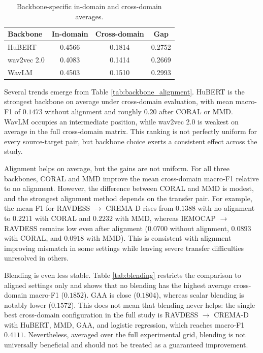﻿\documentclass[10pt,twocolumn,letterpaper]{article}
\begin{document}
\begin{table}[t]
\centering
\caption{Backbone-specific in-domain and cross-domain averages.}
\label{tab:domain_gap}
\scriptsize
\setlength{\tabcolsep}{4pt}
\begin{tabular}{lccc}
\hline
Backbone & In-domain & Cross-domain & Gap \\
\hline
HuBERT & 0.4566 & 0.1814 & 0.2752 \\
wav2vec 2.0 & 0.4083 & 0.1414 & 0.2669 \\
WavLM & 0.4503 & 0.1510 & 0.2993 \\
\hline
\end{tabular}
\end{table}

Several trends emerge from Table \ref{tab:backbone_alignment}. HuBERT is the strongest backbone on average under cross-domain evaluation, with mean macro-F1 of $0.1473$ without alignment and roughly $0.20$ after CORAL or MMD. WavLM occupies an intermediate position, while wav2vec 2.0 is weakest on average in the full cross-domain matrix. This ranking is not perfectly uniform for every source-target pair, but backbone choice exerts a consistent effect across the study.

Alignment helps on average, but the gains are not uniform. For all three backbones, CORAL and MMD improve the mean cross-domain macro-F1 relative to no alignment. However, the difference between CORAL and MMD is modest, and the strongest alignment method depends on the transfer pair. For example, the mean F1 for RAVDESS $\rightarrow$ CREMA-D rises from $0.1388$ with no alignment to $0.2211$ with CORAL and $0.2232$ with MMD, whereas IEMOCAP $\rightarrow$ RAVDESS remains low even after alignment ($0.0700$ without alignment, $0.0893$ with CORAL, and $0.0918$ with MMD). This is consistent with alignment improving mismatch in some settings while leaving severe transfer difficulties unresolved in others.

Blending is even less stable. Table \ref{tab:blending} restricts the comparison to aligned settings only and shows that no blending has the highest average cross-domain macro-F1 ($0.1852$). GAA is close ($0.1804$), whereas scalar blending is notably lower ($0.1572$). This does not mean that blending never helps: the single best cross-domain configuration in the full study is RAVDESS $\rightarrow$ CREMA-D with HuBERT, MMD, GAA, and logistic regression, which reaches macro-F1 $0.4111$. Nevertheless, averaged over the full experimental grid, blending is not universally beneficial and should not be treated as a guaranteed improvement.
\end{document}

